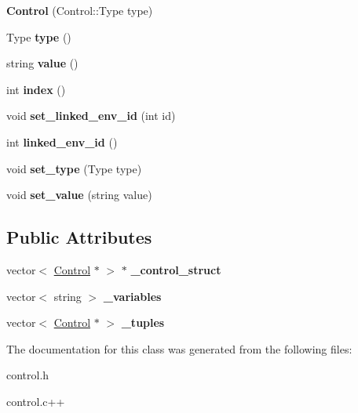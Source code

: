 \begin{DoxyCompactItemize}
\item 
\hypertarget{classControl_ad6aff5424c3c8757ff944e82811bd263}{
{\bfseries Control} (Control::Type type)}
\label{classControl_ad6aff5424c3c8757ff944e82811bd263}

\item 
\hypertarget{classControl_a29657151fef124d4d312f0b7802d8456}{
Type {\bfseries type} ()}
\label{classControl_a29657151fef124d4d312f0b7802d8456}

\item 
\hypertarget{classControl_a211f56b0c94aae1ada32afff1c0b1988}{
string {\bfseries value} ()}
\label{classControl_a211f56b0c94aae1ada32afff1c0b1988}

\item 
\hypertarget{classControl_a9421d4639d1f2d15c512611f762db55b}{
int {\bfseries index} ()}
\label{classControl_a9421d4639d1f2d15c512611f762db55b}

\item 
\hypertarget{classControl_a68fb29afe121b4b000bbac2d4dfe7040}{
void {\bfseries set\_\-linked\_\-env\_\-id} (int id)}
\label{classControl_a68fb29afe121b4b000bbac2d4dfe7040}

\item 
\hypertarget{classControl_a9e04b57a5854cb28af2318f59ec12fe4}{
int {\bfseries linked\_\-env\_\-id} ()}
\label{classControl_a9e04b57a5854cb28af2318f59ec12fe4}

\item 
\hypertarget{classControl_a96b36fd85014457b43388b84dd125878}{
void {\bfseries set\_\-type} (Type type)}
\label{classControl_a96b36fd85014457b43388b84dd125878}

\item 
\hypertarget{classControl_a36e7d957ed52b30ace86d16315004284}{
void {\bfseries set\_\-value} (string value)}
\label{classControl_a36e7d957ed52b30ace86d16315004284}

\end{DoxyCompactItemize}
\subsection*{Public Attributes}
\begin{DoxyCompactItemize}
\item 
\hypertarget{classControl_a789fac1709329ea69d67ab52f9be7ca7}{
vector$<$ \hyperlink{classControl}{Control} $\ast$ $>$ $\ast$ {\bfseries \_\-control\_\-struct}}
\label{classControl_a789fac1709329ea69d67ab52f9be7ca7}

\item 
\hypertarget{classControl_afc67e4eb74a62032e271646d3b91ebf9}{
vector$<$ string $>$ {\bfseries \_\-variables}}
\label{classControl_afc67e4eb74a62032e271646d3b91ebf9}

\item 
\hypertarget{classControl_ad761965741b7aef5f3918d4815e9b4cb}{
vector$<$ \hyperlink{classControl}{Control} $\ast$ $>$ {\bfseries \_\-tuples}}
\label{classControl_ad761965741b7aef5f3918d4815e9b4cb}

\end{DoxyCompactItemize}


The documentation for this class was generated from the following files:\begin{DoxyCompactItemize}
\item 
control.h\item 
control.c++\end{DoxyCompactItemize}
